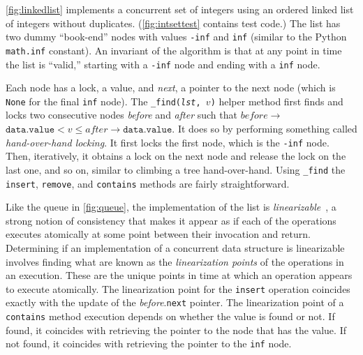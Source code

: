 \documentclass{report}
\begin{document}
\autoref{fig:linkedlist} implements a concurrent set of integers using
an ordered linked list of integers without duplicates.
(\autoref{fig:intsettest} contains test code.)
The list has two dummy ``book-end'' nodes with values \texttt{-inf} and
\texttt{inf} (similar to the Python \texttt{math.inf} constant).
An invariant of the algorithm is that at any point in time the
list is ``valid,'' starting with a \texttt{-inf} node and ending
with a \texttt{inf} node.

%
Each node has a lock, a value, and \textit{next}, a pointer to the next node
(which is \texttt{None} for the final \texttt{inf} node).
The \texttt{\_find(\textit{lst}, $v$)} helper method first
finds and locks two consecutive nodes \textit{before} and \textit{after}
such that $\mathit{before}$$\rightarrow$$\mathtt{data.value} < v \le \mathit{after}$$\rightarrow$$\mathtt{data.value}$.
It does so by performing something called \emph{hand-over-hand locking}.
It first locks the first node, which is the \texttt{-inf} node.
Then, iteratively, it obtains a lock on the next node and release the
lock on the last one, and so on, similar to climbing a tree
hand-over-hand.
Using \texttt{\_find} the \texttt{insert}, \texttt{remove}, and \texttt{contains}
methods are fairly straightforward.

%
Like the queue in \autoref{fig:queue}, the implementation of the list is
\emph{linearizable}~\cite{HW90},
%
a strong notion of consistency that
makes it appear as if each of the operations executes atomically at
some point between their invocation and return.
Determining if an implementation of a concurrent data structure
is linearizable involves finding what are known as the
\emph{linearization points}
%
of the operations in an execution.  These are the unique
points in time at which an operation appears to execute atomically.
The linearization point for the \texttt{insert} operation coincides exactly with the update
of the \textit{before}.\texttt{next} pointer.
The linearization point of a \texttt{contains} method
execution depends on whether the value is found or not.
If found, it coincides with retrieving the pointer to the node
that has the value.
If not found, it coincides with retrieving the pointer to the
\texttt{inf} node.
\end{document}
